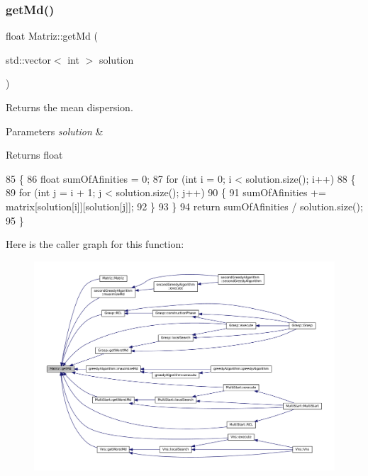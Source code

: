 \subsubsection{\texorpdfstring{get\+Md()}{getMd()}}
{\footnotesize\ttfamily float Matriz\+::get\+Md (\begin{DoxyParamCaption}\item[{std\+::vector$<$ int $>$}]{solution }\end{DoxyParamCaption})}



Returns the mean dispersion. 


\begin{DoxyParams}{Parameters}
{\em solution} & \\
\hline
\end{DoxyParams}
\begin{DoxyReturn}{Returns}
float 
\end{DoxyReturn}

\begin{DoxyCode}
85 \{
86   \textcolor{keywordtype}{float} sumOfAfinities = 0;
87   \textcolor{keywordflow}{for} (\textcolor{keywordtype}{int} i = 0; i < solution.size(); i++)
88   \{
89     \textcolor{keywordflow}{for} (\textcolor{keywordtype}{int} j = i + 1; j < solution.size(); j++)
90     \{
91       sumOfAfinities += matrix[solution[i]][solution[j]];
92     \}
93   \}
94   \textcolor{keywordflow}{return} sumOfAfinities / solution.size();
95 \}
\end{DoxyCode}
Here is the caller graph for this function\+:\nopagebreak
\begin{figure}[H]
\begin{center}
\leavevmode
\includegraphics[width=350pt]{classMatriz_a8df14a27d791f24206dd633b2a685c5b_icgraph}
\end{center}
\end{figure}
\mbox{\label{classMatriz_a61efbcc7ea661059ed0dfad32b5273cf}} 
